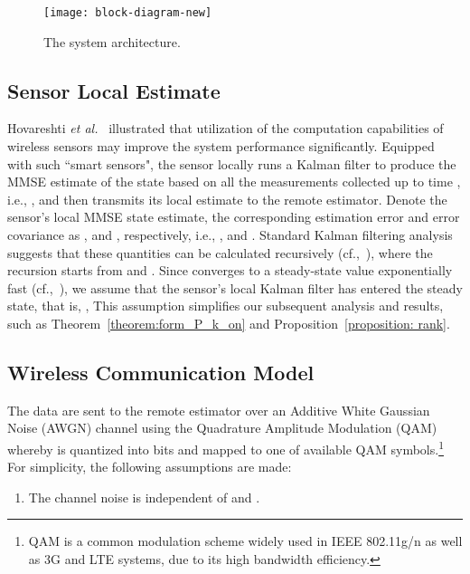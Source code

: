 \documentclass[twocolumn]{autart}    \usepackage{cite}
\begin{document}
{\begin{figure}[htbp]
\centering
  \texttt{[image: block-diagram-new]}
  \caption{The system architecture.} \label{fig:system}
\end{figure}

\subsection{Sensor Local Estimate} \label{sec:local-state-estimate}
Hovareshti \textit{et al.}~\cite{hovareshti2007sensor} illustrated that utilization of the computation capabilities of wireless sensors may improve the system performance significantly.
Equipped with such
``smart sensors", the sensor locally runs a Kalman filter to produce the MMSE
estimate  of the state  based on all the measurements
collected up to time , i.e., , and then
transmits its local estimate to the remote estimator.
Denote the sensor's local MMSE state estimate, the corresponding estimation error and error covariance as ,  and , respectively, i.e., ,  and .
Standard Kalman filtering analysis suggests that
 these quantities can be calculated recursively (cf.,~\cite{andmoo79}),
where the recursion starts from  and .
Since 
converges to a steady-state value exponentially fast (cf.,~\cite{andmoo79}), we assume that the sensor's local Kalman filter has entered the steady state, that is,
,
{This assumption
simplifies our subsequent analysis and results, such as Theorem~\ref{theorem:form_P_k_on} and
Proposition~\ref{proposition: rank}.}


\subsection{Wireless Communication Model}


The data are sent to the remote estimator over
an Additive White Gaussian Noise (AWGN) channel using the Quadrature Amplitude Modulation
(QAM) whereby  is
quantized into  bits and mapped to one of  available QAM
symbols.\footnote{QAM is a common modulation scheme  widely used in IEEE 802.11g/n as well
as 3G and LTE systems, due to its high bandwidth efficiency.} For simplicity, the following assumptions are made:
\vspace{-3mm}
\begin{enumerate}
\item[A.1:]
The channel noise is independent of  and .


\end{enumerate}}
\end{document}
